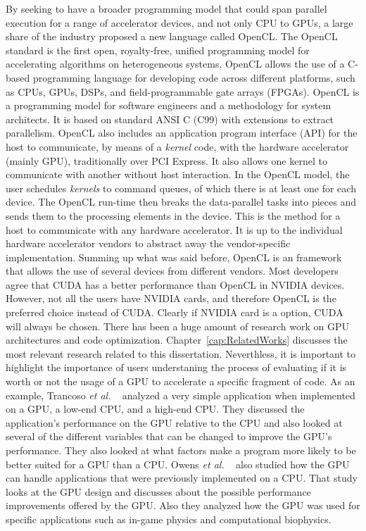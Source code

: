 \documentclass[Ingles]{ic-tese-v1}
\newcommand{\etal}{{\em et al. }}
\newcommand{\rcap}[1]{Chapter~\ref{cap:#1}}
\newcommand{\tit}[1]{{\textit{#1}}}
\begin{document}
By seeking to have a  broader  programming model that could  span parallel execution
for a range of accelerator devices, and not only CPU to GPUs, a large share of
the industry proposed a new language called OpenCL. The OpenCL
standard is the first open, royalty-free, unified programming model for
accelerating algorithms on heterogeneous systems. OpenCL allows the use of a
C-based programming language for developing code across different platforms,
such as CPUs, GPUs, DSPs, and field-programmable gate arrays (FPGAs).  OpenCL
is a programming model for software engineers and a methodology for system
architects. It is based on standard ANSI C (C99) with extensions to extract
parallelism. OpenCL also includes an application program interface (API) for
the host to communicate, by means of a \tit{kernel} code, with the hardware accelerator (mainly GPU),
traditionally over PCI Express. It also allows one kernel to communicate with another
without host interaction.  In the OpenCL model, the user schedules \tit{kernels} to
command queues, of which there is at least one for each device. The OpenCL
run-time then breaks the data-parallel tasks into pieces and sends them to the
processing elements in the device. This is the method for a host to communicate
with any hardware accelerator. It is up to the individual hardware accelerator
vendors to abstract away the vendor-specific implementation.  Summing up what
was said before, OpenCL is an framework that allows the use of several devices
from different vendors. Most developers agree that CUDA has a better
performance than OpenCL in NVIDIA devices. However, not all the users have
NVIDIA cards, and  therefore OpenCL is the preferred choice  instead of CUDA.
Clearly if NVIDIA card is a option, CUDA will always be chosen.
There has been a huge amount of research work on GPU architectures and code
optimization. \rcap{RelatedWorks} discusses the most relevant  research related to this
dissertation. Neverthless, it is important to highlight the importance of users understaning
the process of evaluating  if it is worth or not the usage of a GPU to accelerate a specific
fragment of code.
As an example, Trancoso \etal~\cite{Trancoso2005} analyzed a very simple
application when implemented on a GPU, a low-end CPU, and a high-end CPU. They
discussed the application’s performance on the GPU relative to the CPU and also
looked at several of the different variables that can be changed to improve the
GPU’s performance. They also looked at what factors make a program more likely
to be better suited for a GPU than a CPU. Owens
\etal~\cite{Owens2008} also studied how the GPU can handle applications that
were previously implemented on a CPU. That study looks at the GPU design and
discusses about the possible performance improvements offered by the GPU. Also
they analyzed how the GPU was used for specific applications such as in-game
physics and computational biophysics.
\end{document}
